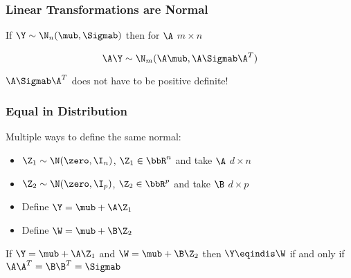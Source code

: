 \documentclass[handout]{beamer}
\begin{document}
\begin{frame} \frametitle{Linear Transformations are Normal}

If $\Y \sim \N_n(\mub, \Sigmab)$ then for $\A$ $m \times n$

$$\A \Y \sim \N_m(\A \mub, \A \Sigmab \A^T)$$


$\A \Sigmab \A^T$ does not have to be positive definite!
  


\end{frame}
\begin{frame}
  \frametitle{Equal in Distribution}
  Multiple ways to define the same normal: \pause

  \begin{itemize}
  \item 
$\Z_1 \sim \N(\zero, \I_n)$, $\Z_1 \in \bbR^n$  and take $\A$ $d
\times n$ \pause
\item $\Z_2 \sim \N(\zero, \I_p)$,  $\Z_2 \in \bbR^p$  and take $\B$ $d
\times p$ \pause
\item Define $\Y = \mub + \A \Z_1$ \pause
\item Define $\W = \mub + \B \Z_2$ \pause
  \end{itemize}
  \begin{theorem}
    If  $\Y = \mub + \A \Z_1$ and $\W = \mub + \B \Z_2$ then $\Y
    \eqindis \W$ if and only if $\A \A^T = \B \B^T = \Sigmab$
  \end{theorem}
\end{frame}

\end{document}
